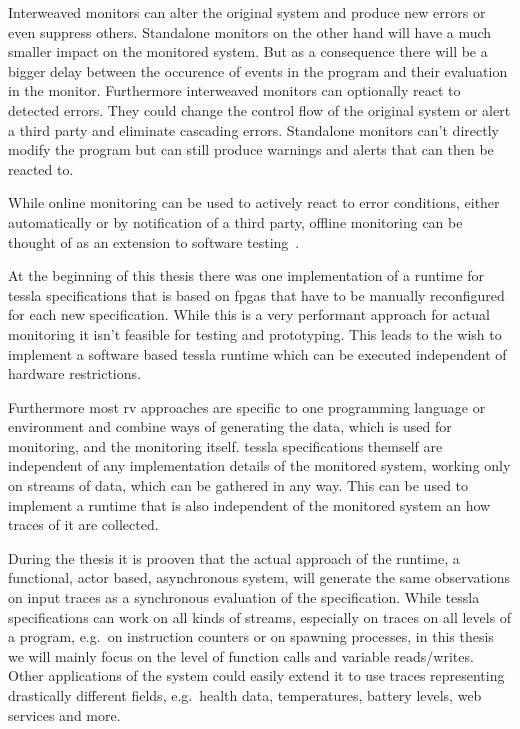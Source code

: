Interweaved monitors can alter the original system and produce new errors or even suppress others.
Standalone monitors on the other hand will have a much smaller impact on the monitored system.
But as a consequence there will be a bigger delay between the occurence of events in the program and their evaluation in the monitor.
Furthermore interweaved monitors can optionally react to detected errors.
They could change the control flow of the original system or alert a third party and eliminate cascading errors.
Standalone monitors can't directly modify the program but can still produce warnings and alerts that can then be reacted to.

While online monitoring can be used to actively react to error conditions, either automatically or by notification of a third party, offline monitoring can be thought of as an extension to software testing~\cite{DAngelo2005}.

At the beginning of this thesis there was one implementation of a runtime for \gls{tessla} specifications that is based on \glspl{fpga} that have to be manually reconfigured for each new specification.
While this is a very performant approach for actual monitoring it isn't feasible for testing and prototyping.
This leads to the wish to implement a software based \gls{tessla} runtime which can be executed independent of hardware restrictions.

Furthermore most \gls{rv} approaches are specific to one programming language or environment and combine ways of generating the data, which is used for monitoring, and the monitoring itself.
\gls{tessla} specifications themself are independent of any implementation details of the monitored system, working only on streams of data, which can be gathered in any way.
This can be used to implement a runtime that is also independent of the monitored system an how traces of it are collected.

During the thesis it is prooven that the actual approach of the runtime, a functional, actor based, asynchronous system, will generate the same observations on input traces as a synchronous evaluation of the specification.
While \gls{tessla} specifications can work on all kinds of streams, especially on traces on all levels of a program, e.g.\ on instruction counters or on spawning processes, in this thesis we will mainly focus on the level of function calls and variable reads/writes.
Other applications of the system could easily extend it to use traces representing drastically different fields, e.g.\ health data, temperatures, battery levels, web services and more.

